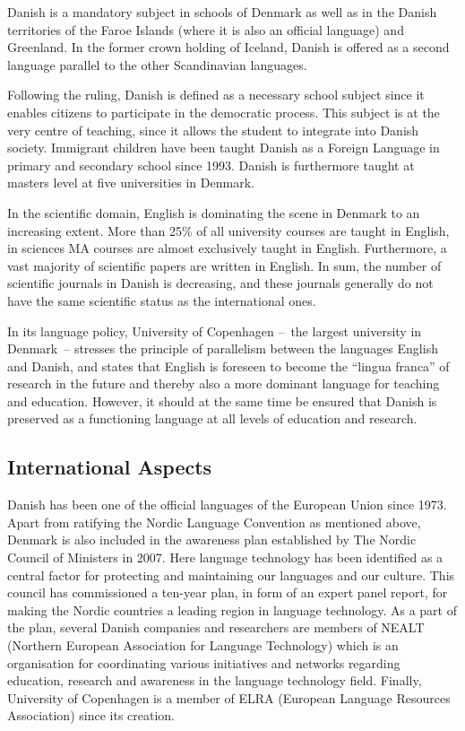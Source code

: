 \begin{multicols}{2}
Danish is a mandatory subject in schools of Denmark as well as in the Danish territories of the Faroe Islands (where it is also an official language) and Greenland. In the former crown holding of Iceland, Danish is offered as a second language parallel to the other Scandinavian languages.

Following the ruling, Danish is defined as a necessary school subject since it enables citizens to participate in the democratic process. This subject is at the very centre of teaching, since it allows the student to integrate into Danish society. Immigrant children have been taught Danish as a Foreign Language in primary and secondary school since 1993. Danish is furthermore taught at masters level at five universities in Denmark. 

In the scientific domain, English is dominating the scene in Denmark to an increasing extent. More than 25\% of all university courses are taught in English, in sciences MA courses are almost exclusively taught in English. Furthermore, a vast majority of scientific papers are written in English. In sum, the number of scientific journals in Danish is decreasing, and these journals generally do not have the same scientific status as the international ones.


In its language policy, University of Copenhagen --~the largest university in Denmark~-- stresses the principle of parallelism between the languages English and Danish, and states that English is foreseen to become the ``lingua franca'' of research in the future and thereby also a more dominant language for teaching and education. However, it should at the same time be ensured that Danish is preserved as a functioning language at all levels of education and research.

\subsection{International Aspects}

  Danish has been one of the official languages of the European Union since 1973.  Apart from ratifying the Nordic Language Convention as mentioned above, Denmark is also included in the awareness plan established by The Nordic Council of Ministers in 2007. Here language technology has been identified as a central factor for protecting and maintaining our languages and our culture. This council has commissioned a ten-year plan, in form of an expert panel report, for making the Nordic countries a leading region in language technology. As a part of the plan, several Danish companies and researchers are members of NEALT (Northern European Association for Language Technology) which is an organisation for coordinating various initiatives and networks regarding education, research and awareness in the language technology field. Finally, University of Copenhagen is a member of ELRA (European Language Resources Association) since its creation.


\end{multicols}
